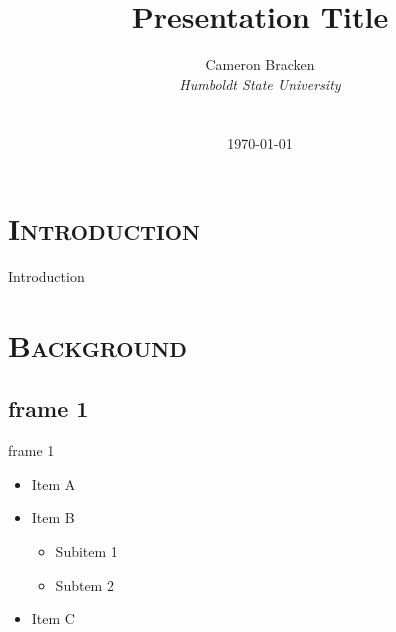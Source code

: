 \documentclass[xcolor=x11names,compress]{beamer}
\renewcommand{\(}{\begin{columns}}
\renewcommand{\)}{\end{columns}}
\newcommand{\<}[1]{\begin{column}{#1}}
\renewcommand{\>}{\end{column}}
\begin{document}
\section{\scshape Introduction}
\begin{frame}
\title{Presentation Title}
\author{
        Cameron Bracken\\
        {\it Humboldt State University}\\
         \\
        \today
}
\date{}
\titlepage
\end{frame}

\begin{frame}{Introduction}
\tableofcontents
\end{frame}

\section{\scshape Background}
\subsection{frame 1}
\begin{frame}{frame 1}
\begin{itemize}
\item Item A
\item Item B
\begin{itemize}
\item Subitem 1
\item Subtem 2
\end{itemize}
\item Item C
\end{itemize}
\end{frame}

\end{document}
